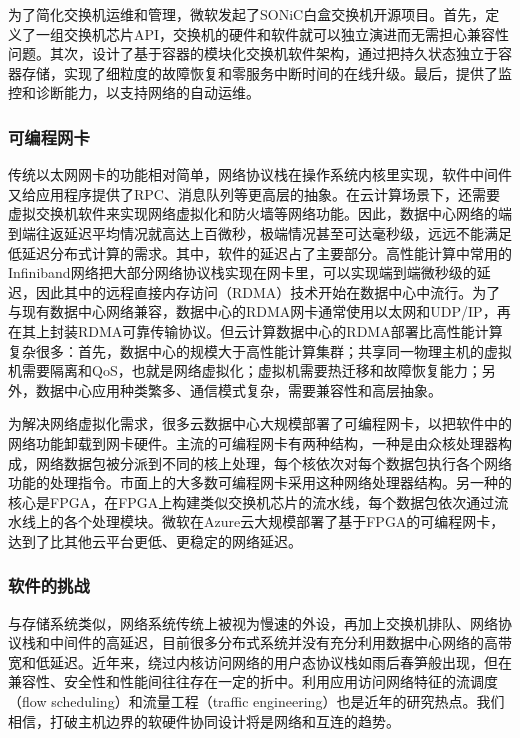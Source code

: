 为了简化交换机运维和管理，微软发起了SONiC白盒交换机开源项目。首先，定义了一组交换机芯片API，交换机的硬件和软件就可以独立演进而无需担心兼容性问题。其次，设计了基于容器的模块化交换机软件架构，通过把持久状态独立于容器存储，实现了细粒度的故障恢复和零服务中断时间的在线升级。最后，提供了监控和诊断能力，以支持网络的自动运维。

\subsubsection{可编程网卡}

传统以太网网卡的功能相对简单，网络协议栈在操作系统内核里实现，软件中间件又给应用程序提供了RPC、消息队列等更高层的抽象。在云计算场景下，还需要虚拟交换机软件来实现网络虚拟化和防火墙等网络功能。因此，数据中心网络的端到端往返延迟平均情况就高达上百微秒，极端情况甚至可达毫秒级，远远不能满足低延迟分布式计算的需求。其中，软件的延迟占了主要部分。高性能计算中常用的Infiniband网络把大部分网络协议栈实现在网卡里，可以实现端到端微秒级的延迟，因此其中的远程直接内存访问（RDMA）技术开始在数据中心中流行。为了与现有数据中心网络兼容，数据中心的RDMA网卡通常使用以太网和UDP/IP，再在其上封装RDMA可靠传输协议。但云计算数据中心的RDMA部署比高性能计算复杂很多：首先，数据中心的规模大于高性能计算集群；共享同一物理主机的虚拟机需要隔离和QoS，也就是网络虚拟化；虚拟机需要热迁移和故障恢复能力；另外，数据中心应用种类繁多、通信模式复杂，需要兼容性和高层抽象。

为解决网络虚拟化需求，很多云数据中心大规模部署了可编程网卡，以把软件中的网络功能卸载到网卡硬件。主流的可编程网卡有两种结构，一种是由众核处理器构成，网络数据包被分派到不同的核上处理，每个核依次对每个数据包执行各个网络功能的处理指令。市面上的大多数可编程网卡采用这种网络处理器结构。另一种的核心是FPGA，在FPGA上构建类似交换机芯片的流水线，每个数据包依次通过流水线上的各个处理模块。微软在Azure云大规模部署了基于FPGA的可编程网卡，达到了比其他云平台更低、更稳定的网络延迟。

\subsubsection{软件的挑战}

与存储系统类似，网络系统传统上被视为慢速的外设，再加上交换机排队、网络协议栈和中间件的高延迟，目前很多分布式系统并没有充分利用数据中心网络的高带宽和低延迟。近年来，绕过内核访问网络的用户态协议栈如雨后春笋般出现，但在兼容性、安全性和性能间往往存在一定的折中。利用应用访问网络特征的流调度（flow scheduling）和流量工程（traffic engineering）也是近年的研究热点。我们相信，打破主机边界的软硬件协同设计将是网络和互连的趋势。

